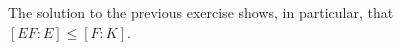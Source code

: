 The solution to the previous exercise shows, in particular, that $[EF:E]\leq [F:K]$. 



%
%
%






